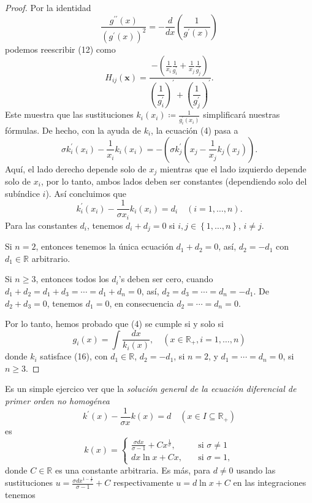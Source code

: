 \documentclass[a4paper,fleqn]{cas-dc}
\begin{document}
\begin{proof}
Por la identidad \[ \frac{g^{\prime\prime}\left(x\right)}{{\left(g^{\prime}\left(x\right)\right)}^{2}}=-\frac{d}{dx}\left(\dfrac{1}{g^{\prime}\left(x\right)}\right) \] podemos reescribir (12) como \[ H_{ij}\left(\bm{x}\right)=\frac{-\left(\frac{1}{x_{i}}\frac{1}{g^{\prime}_{i}}+\frac{1}{x_{j}}\frac{1}{g^{\prime}_{j}}\right)}{{\left(\dfrac{1}{g^{\prime}_{i}}\right)}^{\prime}+{\left(\dfrac{1}{g^{\prime}_{j}}\right)}^{\prime}}. \] Este muestra que las sustituciones $k_{i}\left(x_{i}\right)\coloneqq\frac{1}{g^{\prime}_{i}\left(x_{i}\right)}$ simplificará nuestras fórmulas. De hecho, con la ayuda de $k_{i}$, la ecuación (4) pasa a \[ \sigma k^{\prime}_{i}\left(x_{i}\right)-\frac{1}{x_{i}}k_{i}\left(x_{i}\right)=-\left(\sigma k^{\prime}_{j}\left(x_{j}-\frac{1}{x_{j}}k_{j}\left(x_{j}\right)\right). \] Aquí, el lado derecho depende solo de $x_{j}$ mientras que el lado izquierdo depende solo de $x_{i}$, por lo tanto, ambos lados deben ser constantes (dependiendo solo del subíndice $i$). Así concluimos que
\begin{equation}
k^{\prime}_{i}\left(x_{i}\right)-\frac{1}{\sigma x_{i}}k_{i}\left(x_{i}\right)=d_{i}\quad\left(i=1,\ldots,n\right).
\end{equation}
Para las constantes $d_{i}$, tenemos $d_{i}+d_{j}=0$ si $i,j\in\left\{1,\ldots,n\right\}$, $i\neq j$.

Si $n=2$, entonces tenemos la única ecuación $d_{1}+d_{2}=0$, así, $d_{2}=-d_{1}$ con $d_{1}\in\mathds{R}$ arbitrario.

Si $n\geq3$, entonces todos los $d_{i}$'s deben ser cero, cuando $d_{1}+d_{2}=d_{1}+d_{3}=\cdots=d_{1}+d_{n}=0$, así, $d_{2}=d_{3}=\cdots=d_{n}=-d_{1}$. De $d_{2}+d_{3}=0$, tenemos $d_{1}=0$, en consecuencia $d_{2}=\cdots=d_{n}=0$.

Por lo tanto, hemos probado que (4) se cumple si y solo si \[ g_{i}\left(x\right)=\int\frac{dx}{k_{i}\left(x\right)},\quad\left(x\in\mathds{R}_{+},i=1,\ldots,n\right) \] donde $k_{i}$ satisface (16), con $d_{1}\in\mathds{R}$, $d_{2}=-d_{1}$, si $n=2$, y $d_{1}=\cdots=d_{n}=0$, si $n\geq3$.
\end{proof}
Es un simple ejercico ver que la \emph{solución general de la ecuación diferencial de primer orden no homogénea} \[ k^{\prime}\left(x\right)-\frac{1}{\sigma x}k\left(x\right)=d\quad\left(x\in I\subseteq\mathds{R}_{+}\right) \] es \[ k\left(x\right)=\begin{cases}\frac{\sigma dx}{\sigma-1}+Cx^{\frac{1}{\sigma}},\quad&\text{si }\sigma\neq1\\dx\ln x+Cx,\quad&\text{si }\sigma=1,\end{cases} \] donde $C\in\mathds{R}$ es una constante arbitraria. Es más, para $d\neq0$ usando las sustituciones $u=\frac{\sigma dx^{1-\frac{1}{\sigma}}}{\sigma-1}+C$ respectivamente $u=d\ln x+C$ en las integraciones tenemos
\end{document}
